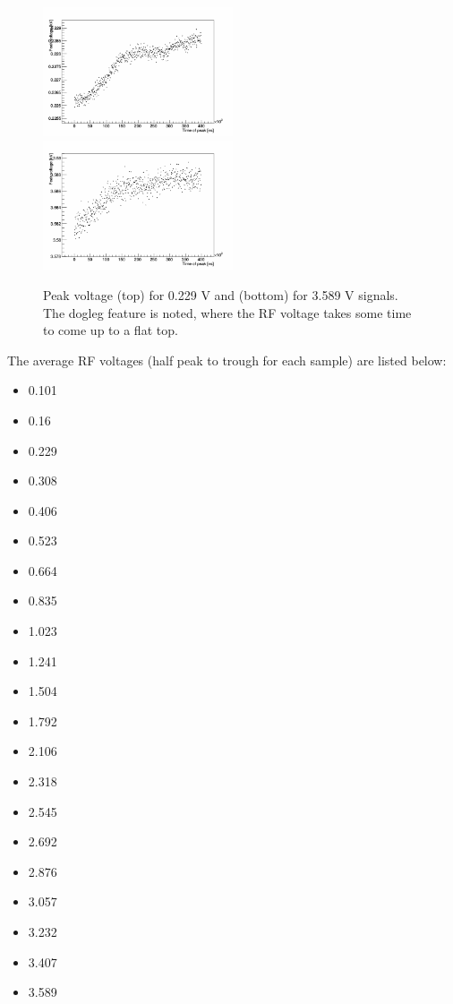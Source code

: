 \documentclass{paper}
\begin{document}
\begin{figure}
		\includegraphics[width=0.5\textwidth]{images/v=0_46_rf_magnitude}
		\includegraphics[width=0.5\textwidth]{images/v=7_18_rf_magnitude}
	\caption{Peak voltage (top) for 0.229 V and (bottom) for 3.589 V signals. The 
           dogleg feature is noted, where the RF voltage takes some time to come
           up to a flat top.}
	\label{fig:rf_peak_magnitudes}
\end{figure}


The average RF voltages (half peak to trough for each sample) are listed below:
\begin{itemize}
\item 0.101
\item 0.16
\item 0.229
\item 0.308
\item 0.406
\item 0.523
\item 0.664
\item 0.835
\item 1.023
\item 1.241
\item 1.504
\item 1.792
\item 2.106
\item 2.318
\item 2.545
\item 2.692
\item 2.876
\item 3.057
\item 3.232
\item 3.407
\item 3.589
\end{itemize}
\end{document}
